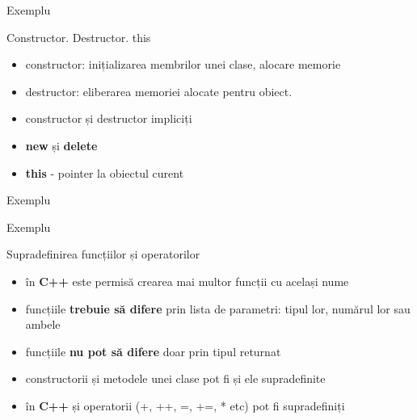\documentclass{beamer}
\begin{document}
\begin{frame}{Exemplu}
	\footnotesize{}
\end{frame}

\begin{frame}{Constructor. Destructor. this}
  \begin{itemize}
  \item constructor: inițializarea membrilor unei clase, alocare memorie
  \item destructor: eliberarea memoriei alocate pentru obiect.
  \item constructor și destructor impliciți
  \item \textbf{new} și \textbf{delete}
  \item \textbf{this} - pointer la obiectul curent
  \end{itemize}
\end{frame}
             
\begin{frame}{Exemplu}
  \footnotesize{}
\end{frame} 

\begin{frame}{Exemplu}
  \footnotesize{}
\end{frame}


\begin{frame}{Supradefinirea funcțiilor și operatorilor}
  \begin{itemize}
  \item în \textbf{C++} este permisă crearea mai multor funcții cu același nume 
  \item funcțiile \textbf{trebuie să difere} prin lista de parametri: tipul lor, numărul lor sau ambele
  \item funcțiile \textbf{nu pot să difere} doar prin tipul returnat
  \item constructorii și metodele unei clase pot fi și ele supradefinite
  \item în \textbf{C++} și operatorii (+, ++, =, +=, * etc) pot fi supradefiniți
  \end{itemize}
\end{frame}
\end{document}
